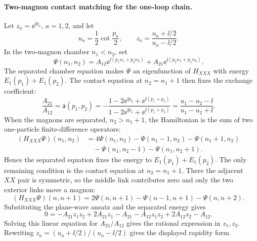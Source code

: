 \paragraph{Two-magnon contact matching for the one-loop chain.}
Let \(z_a=\ee^{\ii p_a}\), \(a=1,2\), and let
\[
  u_a=\frac12\cot\frac{p_a}{2},
  \qquad
  z_a=\frac{u_a+\ii/2}{u_a-\ii/2}.
\]
In the two-magnon chamber \(n_1<n_2\), set
\[
  \Psi(n_1,n_2)
  =
  A_{12}\ee^{\ii(p_1n_1+p_2n_2)}
  +
  A_{21}\ee^{\ii(p_2n_1+p_1n_2)} .
\]
The separated chamber equation makes \(\Psi\) an eigenfunction of \(H_{XXX}\)
with energy \(E_1(p_1)+E_1(p_2)\).  The contact equation at
\(n_2=n_1+1\) then fixes the exchange coefficient:
\[
  \frac{A_{21}}{A_{12}}
  =
  \mathsf a(p_1,p_2)
  =
  -\frac{1-2\ee^{\ii p_2}+\ee^{\ii(p_1+p_2)}}
          {1-2\ee^{\ii p_1}+\ee^{\ii(p_1+p_2)}}
  =
  \frac{u_1-u_2-\ii}{u_1-u_2+\ii}.
\]
When the magnons are separated, \(n_2>n_1+1\), the Hamiltonian is the sum of
two one-particle finite-difference operators:
\[
\begin{aligned}
  (H_{XXX}\Psi)(n_1,n_2)
  &=
  4\Psi(n_1,n_2)-\Psi(n_1-1,n_2)-\Psi(n_1+1,n_2)
\\
  &\quad
  -\Psi(n_1,n_2-1)-\Psi(n_1,n_2+1).
\end{aligned}
\]
Hence the separated equation fixes the energy to
\(E_1(p_1)+E_1(p_2)\).  The only remaining condition is the contact equation
at \(n_2=n_1+1\).  There the adjacent \(XX\) pair is symmetric, so the
middle link contributes zero and only the two exterior links move a magnon:
\[
  (H_{XXX}\Psi)(n,n+1)
  =
  2\Psi(n,n+1)-\Psi(n-1,n+1)-\Psi(n,n+2).
\]
Substituting the plane-wave ansatz and the separated energy gives
\[
  0
  =
  -A_{21}z_1z_2+2A_{21}z_1-A_{21}
  -A_{12}z_1z_2+2A_{12}z_2-A_{12}.
\]
Solving this linear equation for \(A_{21}/A_{12}\) gives the rational
expression in \(z_1,z_2\).  Rewriting \(z_a=(u_a+\ii/2)/(u_a-\ii/2)\) gives
the displayed rapidity form.

